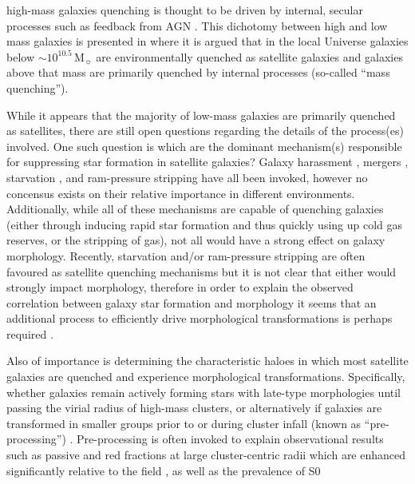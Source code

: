 \documentclass[a4paper,fleqn,usenatbib]{mnras}
\newcommand{\Msun}{\,\mathrm{M_{\sun}}}
\begin{document}
high-mass galaxies quenching is thought to be driven by internal, secular
processes such as feedback from AGN \citep[e.g.][]{schawinski2009}.  This
dichotomy between high and low mass galaxies is 
presented in \citet{peng2010} where it is argued that in
the local Universe galaxies below $\sim\!10^{10.5}\Msun$ are
environmentally quenched as satellite galaxies and galaxies above that
mass are primarily quenched by internal processes (so-called ``mass
quenching'').
\par
While it appears that the majority of low-mass galaxies are primarily quenched
as satellites, there are still open questions regarding the details of
the process(es) involved.  One such question is which are the dominant
mechanism(s)
responsible for suppressing star formation in satellite galaxies?
Galaxy harassment \citep[e.g.][]{moore1996}, mergers \citep[e.g.][]{mihos1994},
starvation \citep[e.g.][]{kawata2008}, and ram-pressure stripping
\citep[e.g.][]{gunn1972} have all been invoked, however no concensus
exists on their relative importance in different environments.
Additionally, while all of these mechanisms are capable of
quenching galaxies (either through inducing rapid star formation and
thus quickly using up cold gas reserves, or
the stripping of gas), not all would have a strong effect on galaxy
morphology.  Recently, starvation and/or ram-pressure stripping are
often favoured
as satellite quenching mechanisms \citep{muzzin2014, peng2015, fillingham2015,
  weisz2015, wetzel2015} but it is not clear that either
would strongly impact morphology, therefore in order to explain the
observed correlation between galaxy star formation and morphology it
seems that an additional process to efficiently drive morphological
transformations is perhaps required \citep[e.g.][]{christlein2004}.
\par
Also of importance is determining
the characteristic haloes in which most satellite galaxies are
quenched and experience morphological transformations.  Specifically, whether galaxies remain actively forming
stars with late-type morphologies until passing the virial radius of high-mass clusters, or
alternatively if galaxies are transformed in smaller groups prior
to or during cluster infall (known as ``pre-processing'')
\citep[e.g.][]{fujita2004}.  Pre-processing is
often invoked to explain observational results such as passive and
red fractions at large cluster-centric radii which are enhanced
significantly relative to the field \citep{lu2012, wetzel2012,
  bahe2013, haines2015, just2015}, as well as the prevalence of S0
\end{document}

